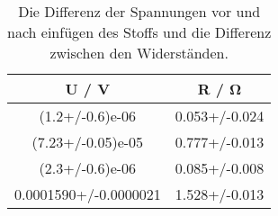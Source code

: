 \begin{table}\caption{Die Differenz der Spannungen vor und nach einfügen des Stoffs und die Differenz zwischen den Widerständen.}
\label{tab3}
\centering
{}
\begin{tabular}{S[]S[]} 
\toprule
{U / \si{\volt}} & {R / \si{\ohm}}\\
\midrule
(1.2+/-0.6)e-06 & 0.053+/-0.024\\
(7.23+/-0.05)e-05 & 0.777+/-0.013\\
(2.3+/-0.6)e-06 & 0.085+/-0.008\\
0.0001590+/-0.0000021 & 1.528+/-0.013\\
\bottomrule
\end{tabular}\end{table}